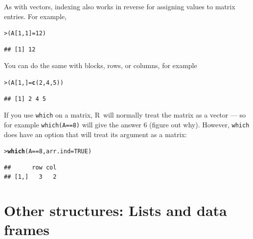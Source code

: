 \documentclass[11pt]{article}\usepackage[]{graphicx}\usepackage[]{color}
\makeatletter
\newcommand{\hlnum}[1]{\textcolor[rgb]{0.686,0.059,0.569}{#1}}%
\newcommand{\hlopt}[1]{\textcolor[rgb]{0,0,0}{#1}}%
\newcommand{\hlstd}[1]{\textcolor[rgb]{0.345,0.345,0.345}{#1}}%
\newcommand{\hlkwb}[1]{\textcolor[rgb]{0.69,0.353,0.396}{#1}}%
\newcommand{\hlkwc}[1]{\textcolor[rgb]{0.333,0.667,0.333}{#1}}%
\newcommand{\hlkwd}[1]{\textcolor[rgb]{0.737,0.353,0.396}{\textbf{#1}}}%
\newenvironment{kframe}{%
 \def\at@end@of@kframe{}%
 \ifinner\ifhmode%
  \def\at@end@of@kframe{\end{minipage}}%
  \begin{minipage}{\columnwidth}%
 \fi\fi%
 \def\FrameCommand##1{\hskip\@totalleftmargin \hskip-\fboxsep
 \colorbox{shadecolor}{##1}\hskip-\fboxsep
     \hskip-\linewidth \hskip-\@totalleftmargin \hskip\columnwidth}%
 \MakeFramed {\advance\hsize-\width
   \@totalleftmargin\z@ \linewidth\hsize
   \@setminipage}}%
 {\par\unskip\endMakeFramed%
 \at@end@of@kframe}
\newenvironment{knitrout}{}{} %
\newcommand{\code}[1]{{\tt #1}}
\newcommand\R{{\sf R}}
\numberwithin{exercise}{section}
\makeatother
\begin{document}
As with vectors, indexing also works in reverse for assigning values to matrix 
entries. For example,
\begin{knitrout}
\color{fgcolor}\begin{kframe}
\begin{alltt}
\hlstd{> }\hlstd{(A[}\hlnum{1}\hlstd{,} \hlnum{1}\hlstd{]} \hlkwb{=} \hlnum{12}\hlstd{)}
\end{alltt}
\begin{verbatim}
## [1] 12
\end{verbatim}
\end{kframe}
\end{knitrout}

You can do the same with blocks, rows, or columns, for example
\begin{knitrout}
\color{fgcolor}\begin{kframe}
\begin{alltt}
\hlstd{> }\hlstd{(A[}\hlnum{1}\hlstd{,]}\hlkwb{=}\hlkwd{c}\hlstd{(}\hlnum{2}\hlstd{,} \hlnum{4}\hlstd{,} \hlnum{5}\hlstd{))}
\end{alltt}
\begin{verbatim}
## [1] 2 4 5
\end{verbatim}
\end{kframe}
\end{knitrout}

If you use \code{which} on a matrix, \R\ will normally
treat the matrix as a vector --- so for example
\code{which(A==8)} will give the answer 6 (figure out
why).  However, \code{which} does have an 
option that will treat its argument
as a matrix:
\begin{knitrout}
\color{fgcolor}\begin{kframe}
\begin{alltt}
\hlstd{> }\hlkwd{which}\hlstd{(A}\hlopt{==}\hlnum{8}\hlstd{,}\hlkwc{arr.ind}\hlstd{=}\hlnum{TRUE}\hlstd{)}
\end{alltt}
\begin{verbatim}
##      row col
## [1,]   3   2
\end{verbatim}
\end{kframe}
\end{knitrout}

\section{Other structures: Lists and data frames}
\end{document}
